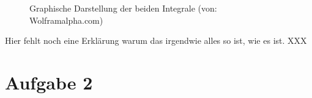 \documentclass[11pt,a4paper,ngerman]{article}
\begin{document}
\begin{description}
\begin{figure}[ht]
\centering
{}
\caption{Graphische Darstellung der beiden Integrale (von: Wolframalpha.com)}
\end{figure}

Hier fehlt noch eine Erklärung warum das irgendwie alles so ist, wie es ist. XXX

\end{description}


\newpage

\section*{Aufgabe 2}

\label{LastPage}
\end{document}
